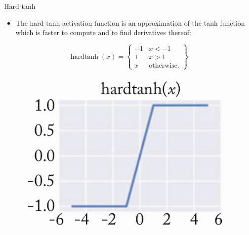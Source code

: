 \documentclass[handout]{beamer}
\begin{document}
\begin{frame}{Hard tanh}
\begin{scriptsize}
\begin{itemize}
\item The hard-tanh activation function is an approximation of the tanh function which is faster to compute and to find derivatives thereof:
\end{itemize}

  \[
    \operatorname{hardtanh}(x) = \left\{\begin{array}{lr}
        -1 & x < -1\\
        1 & x > 1\\
        x & \text{otherwise.} 
        \end{array} \right\} 
  \]

\begin{figure}[htb]
	\centering
	 \includegraphics[scale=0.3]{pics/hardtanh.png}
\end{figure}

\end{scriptsize}
\end{frame}
\end{document}
